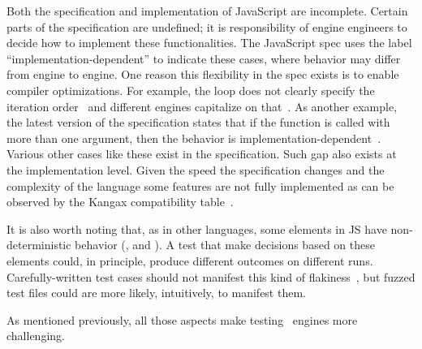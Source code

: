 \documentclass[10pt,conference,anonymous]{IEEEtran}
\begin{document}
Both the specification and implementation of JavaScript are
incomplete. Certain parts of the specification are undefined; it is
responsibility of engine engineers to decide how to implement these
functionalities. The JavaScript spec uses the label
``implementation-dependent'' to indicate these cases, where behavior
may differ from engine to engine. One reason this flexibility in the
spec exists is to enable compiler optimizations. For example, the
 loop does not clearly specify the iteration
order~\cite{so-forin-undefined,javascript-in-chrome} and different
engines capitalize on that~\cite{for-in-undefined}.  As another
example, the latest version of the \es{} specification states that if
the  function is called with more than
one argument, then the behavior is
implementation-dependent~\cite{es6-toPrecision}. Various other cases
like these exist in the specification. Such gap also exists at the
implementation level. Given the speed the specification changes and
the complexity of the language some features are not fully implemented
as can be observed by the Kangax compatibility table~\cite{kangax}.

\sloppy It is also worth noting that, as in other languages, some
elements in JS have non-deterministic behavior (\eg{},
 and ). A test that make decisions
based on these elements could, in principle, produce different
outcomes on different runs. Carefully-written test cases should not
manifest this kind of
flakiness~\cite{luo-etal-fse2014,palomba-zaidman-icsme2017}, but
fuzzed test files could are more likely, intuitively, to manifest
them.

As mentioned previously, all those aspects make testing \js\ engines
more challenging.





\end{document}
